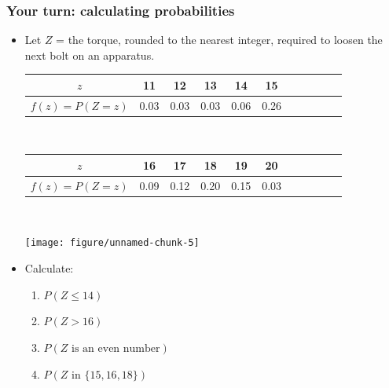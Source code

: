 \documentclass[handout]{beamer}\usepackage{graphicx, color}
\newenvironment{knitrout}{}{} %
\providecommand{\q}{$\quad$ \newline}
\numberwithin{equation}{section}
\begin{document}
\begin{frame}
\frametitle{Your turn: calculating probabilities} \scriptsize
\begin{itemize}
\item Let $Z$ = the torque, rounded to the nearest integer, required to loosen the next bolt on an apparatus. \q 


\begin{center}
\begin{tabular}{ccccccccccc}
$z$ & 11 & 12 & 13 & 14 & 15 \\ \hline
$f(z) = P(Z = z)$ & 0.03 & 0.03 & 0.03 & 0.06 & 0.26 
\end{tabular} \q

\begin{tabular}{ccccccccccc}
$z$ & 16 & 17 & 18 & 19 & 20 \\ \hline
$f(z) = P(Z = z)$ &  0.09 & 0.12 & 0.20 & 0.15 & 0.03 
\end{tabular} \q \q

\begin{knitrout}
\color{fgcolor}
\texttt{[image: figure/unnamed-chunk-5]} 

\end{knitrout}

\end{center}
\item Calculate:
\begin{enumerate}[1. ]
\item $P(Z \le 14)$
\item $P(Z > 16)$
\item $P(Z \text{ is an even number})$
\item $P(Z \text{ in } \{15, 16, 18\})$
\end{enumerate}
\end{itemize}
\end{frame}
\end{document}
